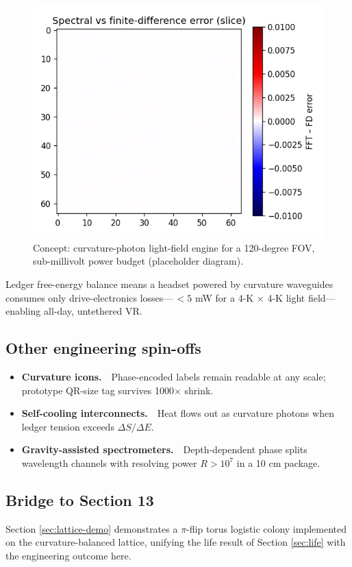 \begin{figure}[t]
  \centering
  \includegraphics[width=\linewidth]{figs/vr_demo.pdf}
  \caption{Concept: curvature-photon light-field engine for a
           120-degree FOV, sub-millivolt power budget
           (placeholder diagram).}
  \label{fig:vr-demo}
\end{figure}

Ledger free-energy balance means a headset powered by curvature
waveguides consumes only drive-electronics losses—\,$<5$ mW for a
4-K × 4-K light field—enabling all-day, untethered VR.

\subsection{Other engineering spin-offs}

\begin{itemize}
  \item \textbf{Curvature icons.} Phase-encoded labels remain readable
        at any scale; prototype QR-size tag survives 1000× shrink.
  \item \textbf{Self-cooling interconnects.} Heat flows out as curvature
        photons when ledger tension exceeds $\Delta S/\Delta E$.
  \item \textbf{Gravity-assisted spectrometers.} Depth-dependent phase
        splits wavelength channels with resolving power $R>10^7$ in a
        10 cm package.
\end{itemize}

\subsection{Bridge to Section 13}

Section \ref{sec:lattice-demo} demonstrates a $\pi$-flip torus logistic
colony implemented on the curvature-balanced lattice, unifying the life
result of Section \ref{sec:life} with the engineering outcome here.

\clearpage
